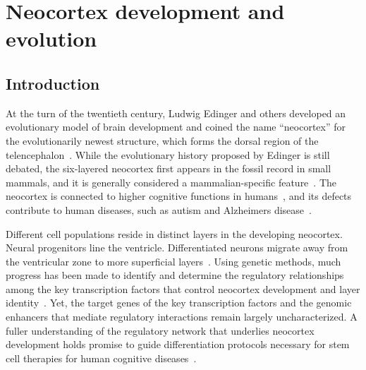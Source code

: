 \chapter{Neocortex development and evolution}
\label{chap:neocortex}

\section{Introduction}
At the turn of the twentieth century, Ludwig Edinger and others developed an evolutionary model of brain development and
coined the name ``neocortex'' for the evolutionarily newest structure, which forms the dorsal region of the telencephalon~\citep{Jarvis2005}.
While the evolutionary history proposed by Edinger is still debated, the six-layered neocortex first appears in the fossil
record in small mammals, and it is generally considered a mammalian-specific feature~\citep{Rakic2009}.  The neocortex is
connected to higher cognitive functions in humans~\citep{Lui2011}, and its defects contribute to human diseases, such as
autism and Alzheimers disease~\citep{Walsh2008, Wexler2011}.

Different cell populations reside in distinct layers in the developing neocortex.  Neural progenitors line the ventricle.
Differentiated neurons migrate away from the ventricular zone to more superficial layers~\citep{Molyneaux2007}.  Using
genetic methods, much progress has been made to identify and determine the regulatory relationships among the key transcription
factors that control neocortex development and layer identity~\citep{Leone2008}.  Yet, the target genes of the key transcription
factors and the genomic enhancers that mediate regulatory interactions remain largely uncharacterized.  A fuller understanding
of the regulatory network that underlies neocortex development holds promise to guide differentiation protocols necessary for
stem cell therapies for human cognitive diseases~\citep{Hansen2011}.


